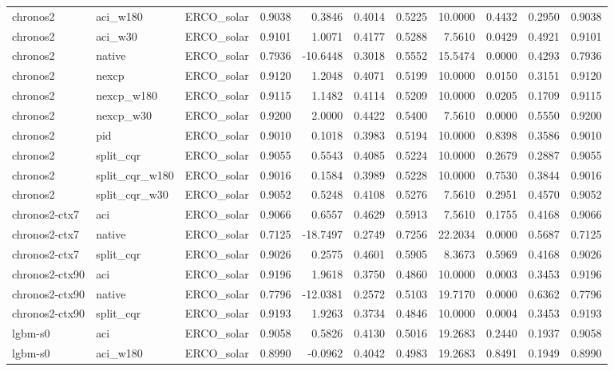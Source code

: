 \begin{tabular}{lllrrrrrrrr}
chronos2 & aci_w180 & ERCO_solar & 0.9038 & 0.3846 & 0.4014 & 0.5225 & 10.0000 & 0.4432 & 0.2950 & 0.9038 \\
chronos2 & aci_w30 & ERCO_solar & 0.9101 & 1.0071 & 0.4177 & 0.5288 & 7.5610 & 0.0429 & 0.4921 & 0.9101 \\
chronos2 & native & ERCO_solar & 0.7936 & -10.6448 & 0.3018 & 0.5552 & 15.5474 & 0.0000 & 0.4293 & 0.7936 \\
chronos2 & nexcp & ERCO_solar & 0.9120 & 1.2048 & 0.4071 & 0.5199 & 10.0000 & 0.0150 & 0.3151 & 0.9120 \\
chronos2 & nexcp_w180 & ERCO_solar & 0.9115 & 1.1482 & 0.4114 & 0.5209 & 10.0000 & 0.0205 & 0.1709 & 0.9115 \\
chronos2 & nexcp_w30 & ERCO_solar & 0.9200 & 2.0000 & 0.4422 & 0.5400 & 7.5610 & 0.0000 & 0.5550 & 0.9200 \\
chronos2 & pid & ERCO_solar & 0.9010 & 0.1018 & 0.3983 & 0.5194 & 10.0000 & 0.8398 & 0.3586 & 0.9010 \\
chronos2 & split_cqr & ERCO_solar & 0.9055 & 0.5543 & 0.4085 & 0.5224 & 10.0000 & 0.2679 & 0.2887 & 0.9055 \\
chronos2 & split_cqr_w180 & ERCO_solar & 0.9016 & 0.1584 & 0.3989 & 0.5228 & 10.0000 & 0.7530 & 0.3844 & 0.9016 \\
chronos2 & split_cqr_w30 & ERCO_solar & 0.9052 & 0.5248 & 0.4108 & 0.5276 & 7.5610 & 0.2951 & 0.4570 & 0.9052 \\
chronos2-ctx7 & aci & ERCO_solar & 0.9066 & 0.6557 & 0.4629 & 0.5913 & 7.5610 & 0.1755 & 0.4168 & 0.9066 \\
chronos2-ctx7 & native & ERCO_solar & 0.7125 & -18.7497 & 0.2749 & 0.7256 & 22.2034 & 0.0000 & 0.5687 & 0.7125 \\
chronos2-ctx7 & split_cqr & ERCO_solar & 0.9026 & 0.2575 & 0.4601 & 0.5905 & 8.3673 & 0.5969 & 0.4168 & 0.9026 \\
chronos2-ctx90 & aci & ERCO_solar & 0.9196 & 1.9618 & 0.3750 & 0.4860 & 10.0000 & 0.0003 & 0.3453 & 0.9196 \\
chronos2-ctx90 & native & ERCO_solar & 0.7796 & -12.0381 & 0.2572 & 0.5103 & 19.7170 & 0.0000 & 0.6362 & 0.7796 \\
chronos2-ctx90 & split_cqr & ERCO_solar & 0.9193 & 1.9263 & 0.3734 & 0.4846 & 10.0000 & 0.0004 & 0.3453 & 0.9193 \\
lgbm-s0 & aci & ERCO_solar & 0.9058 & 0.5826 & 0.4130 & 0.5016 & 19.2683 & 0.2440 & 0.1937 & 0.9058 \\
lgbm-s0 & aci_w180 & ERCO_solar & 0.8990 & -0.0962 & 0.4042 & 0.4983 & 19.2683 & 0.8491 & 0.1949 & 0.8990 \\

\end{tabular}
